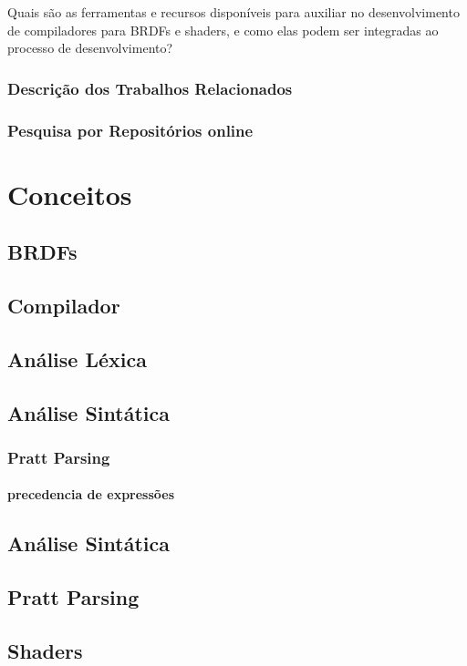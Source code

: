 \documentclass[english, 
               brazil, 
               bsc] %
               {dcomp-abntex2}
\begin{document}
Quais são as ferramentas e recursos disponíveis para auxiliar no desenvolvimento de compiladores para BRDFs e shaders, e como elas podem ser integradas ao processo de desenvolvimento?

\subsection{Descrição dos Trabalhos Relacionados}

\subsection{Pesquisa por Repositórios online}


\chapter{Conceitos}

\section{BRDFs}

\section{Compilador}
\section{Análise Léxica}
\section{Análise Sintática}
\subsection{Pratt Parsing}
\subsubsection{precedencia de expressões}
\section{Análise Sintática}
\section{Pratt Parsing}
\section{Shaders}
\end{document}
